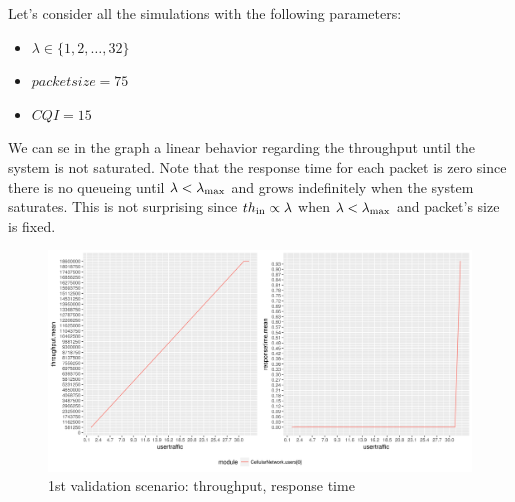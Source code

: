 Let's consider all the simulations with the following parameters:
\begin{itemize}
	\item \(\lambda \in \{1,2,\ldots,32\}\)
	\item \(packetsize=75\)
	\item \(CQI=15\)
\end{itemize}
  We can se in the graph a linear behavior regarding the throughput until the system is not saturated. Note that the response time for each packet is zero since there is no queueing until \(\lambda < \lambda\textsubscript{max}\) and grows indefinitely when the system saturates. This is not surprising since \(th\textsubscript{in} \propto \lambda\) when \(\lambda < \lambda\textsubscript{max}\) and packet's size is fixed.
\begin{figure}[H]
  \includegraphics[width=1\textwidth]{images/all-val1}
  \caption{1st validation scenario: throughput, response time}
  \label{fig:1st validation scenario: throughput, response time}
\end{figure}

